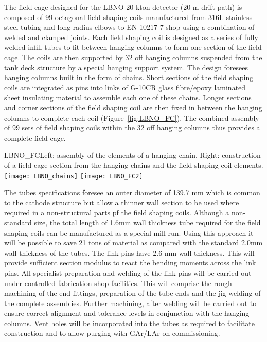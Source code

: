 The field cage designed for the LBNO 20 kton detector (20 m drift path) is composed of 99 octagonal field shaping coils manufactured from 316L stainless steel tubing and long radius elbows to EN 10217-7 shop using a combination of welded and clamped joints. Each field shaping coil is designed as a series of fully welded infill tubes to fit between hanging columns to form one section of the field cage. The coils are then supported by 32 off hanging columns suspended from the tank deck structure by a special hanging support system. The design foresees hanging columns built in the form of chains. Short sections of the field shaping coils are integrated as pins into links of G-10CR glass fibre/epoxy laminated sheet insulating material to assemble each one of these chains. Longer sections and corner sections of the field shaping coil are then fixed in between the hanging columns to complete each coil (Figure~\ref{fig:LBNO_FC}). The combined assembly of 99 sets of field shaping coils within the 32 off hanging columns thus provides a complete field cage.

\begin{cdrfigure}{LBNO_FC}{\small Left: assembly of the elements of a hanging chain. Right: construction of a field cage section from the hanging chains and the field shaping coil elements.}
\texttt{[image: LBNO\_chains]} \hfill
\texttt{[image: LBNO\_FC2]}
\end{cdrfigure}

The tubes specifications foresee an outer diameter of  139.7 mm which is common to the cathode structure but allow a thinner wall section to be used where required in a non-structural parts pf the field shaping coils.  Although a non-standard size, the total length of 1.6mm wall thickness tube required for the field shaping coils can be manufactured as a special mill run.  Using this approach it will be possible to save 21 tons of material as compared with the standard 2.0mm wall thickness of the tubes. The link pins have 2.6 mm wall thickness. This will provide sufficient section modulus to react the bending moments across the link pins. All specialist preparation and welding of the link pins will be carried out under controlled fabrication shop facilities.  This will comprise the rough machining of the end fittings, preparation of the tube ends and the jig welding of the complete assemblies. Further machining, after welding will be carried out to ensure correct alignment and tolerance levels in conjunction with the hanging columns.  Vent holes will be incorporated into the tubes as required to facilitate construction and to allow purging with GAr/LAr on commissioning.


